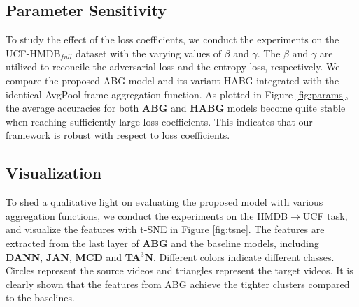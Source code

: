 \begin{table}[t]
\caption{The ablation performance of the proposed ABG and HABG models on the full UCF-HMDB dataset.}\vspace{-0.4cm}
\label{tab:ablation}
\end{table}

\vspace{-0.3cm}
\subsection{Parameter Sensitivity}
To study the effect of the loss coefficients, we conduct the experiments on the UCF-HMDB$_{full}$ dataset with the varying values of $\beta$ and $\gamma$. The $\beta$ and $\gamma$ are utilized to reconcile the adversarial loss and the entropy loss, respectively. We compare the proposed ABG model and its variant HABG integrated with the identical AvgPool frame aggregation function. As plotted in Figure \ref{fig:params}, the average accuracies for both \textbf{ABG} and \textbf{HABG} models become quite stable when reaching sufficiently large loss coefficients. This indicates that our framework is robust with respect to loss coefficients.

\vspace{-0.2cm}
\subsection{Visualization}
To shed a qualitative light on evaluating the proposed model with various aggregation functions, we conduct the experiments on the HMDB$\rightarrow$UCF task, and visualize the features with t-SNE in Figure \ref{fig:tsne}. The features are extracted from the last layer of \textbf{ABG} and the baseline models, including \textbf{DANN}, \textbf{JAN}, \textbf{MCD} and \textbf{TA$^3$N}. Different colors indicate different classes. Circles represent the source videos and triangles represent the target videos. It is clearly shown that the features from ABG achieve the tighter clusters compared to the baselines.


